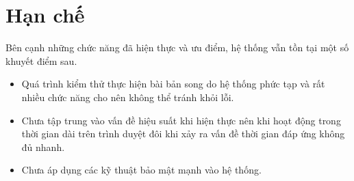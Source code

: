 \section{Hạn chế}
Bên cạnh những chức năng đã hiện thực và ưu điểm, hệ thống vẫn tồn tại một số khuyết điểm sau.
\begin{itemize}
    \item Quá trình kiểm thử thực hiện bài bản song do hệ thống phức tạp và rất nhiều chức năng cho nên không thể tránh khỏi lỗi.
    \item Chưa tập trung vào vấn đề hiệu suất khi hiện thực nên khi hoạt động trong thời gian dài trên trình duyệt đôi khi xảy ra vấn đề thời gian đáp ứng không đủ nhanh.
    \item Chưa áp dụng các kỹ thuật bảo mật mạnh vào hệ thống.
\end{itemize}

